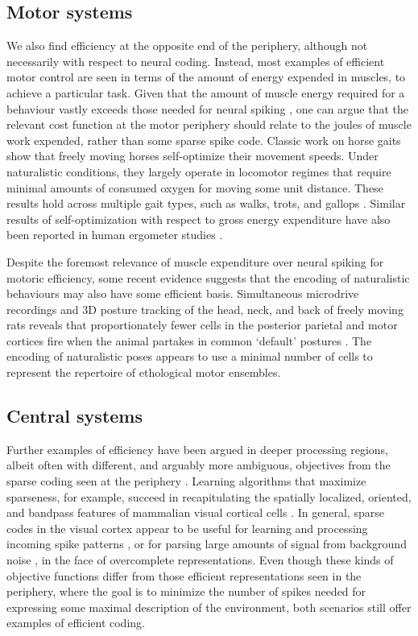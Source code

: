 \documentclass[twocolumn]{article}
\begin{document}
\subsection{Motor systems}

We also find efficiency at the opposite end of the periphery, although not necessarily with respect to neural coding. Instead, most examples of efficient motor control are seen in terms of the amount of energy expended in muscles, to achieve a particular task. Given that the amount of muscle energy required for a behaviour vastly exceeds those needed for neural spiking \cite{ortega_2015, sengupta_2010}, one can argue that the relevant cost function at the motor periphery should relate to the joules of muscle work expended, rather than some sparse spike code. Classic work on horse gaits show that freely moving horses self-optimize their movement speeds. Under naturalistic conditions, they largely operate in locomotor regimes that require minimal amounts of consumed oxygen for moving some unit distance. These results hold across multiple gait types, such as walks, trots, and gallops \cite{hoyt_taylor_1981}. Similar results of self-optimization with respect to gross energy expenditure have also been reported in human ergometer studies \cite{sparrow_newell_1998}. 

Despite the foremost relevance of muscle expenditure over neural spiking for motoric efficiency, some recent evidence suggests that the encoding of naturalistic behaviours may also have some efficient basis. Simultaneous microdrive recordings and 3D posture tracking of the head, neck, and back of freely moving rats reveals that proportionately fewer cells in the posterior parietal and motor cortices fire when the animal partakes in common `default' postures \cite{Mimica_Dunn_Tombaz_Bojja_Whitlock_2018}. The encoding of naturalistic poses appears to use a minimal number of cells to represent the repertoire of ethological motor ensembles. 

\subsection{Central systems}

Further examples of efficiency have been argued in deeper processing regions, albeit often with different, and arguably more ambiguous, objectives from the sparse coding seen at the periphery \cite{simoncelli_2003}. Learning algorithms that maximize sparseness, for example, succeed in recapitulating the spatially localized, oriented, and bandpass features of mammalian visual cortical cells \cite{olshausen_field_1996}. In general, sparse codes in the visual cortex appear to be useful for learning and processing incoming spike patterns \cite{olshausen_field_1996}, or for parsing large amounts of signal from background noise \cite{ringach_malone_2007}, in the face of overcomplete representations. Even though these kinds of objective functions differ from those efficient representations seen in the periphery, where the goal is to minimize the number of spikes needed for expressing some maximal description of the environment, both scenarios still offer examples of efficient coding. 
\end{document}
